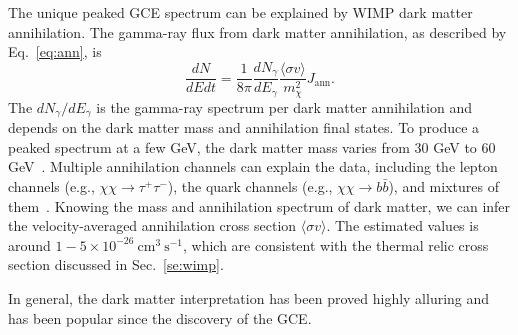 \documentclass[doublespace,nopageskip]{VTthesis}
\newcommand{\sigmav}{\langle\sigma v\rangle}
\begin{document}
The unique peaked GCE spectrum can be explained by WIMP dark matter annihilation. The gamma-ray flux from dark matter annihilation, as described by Eq.~\ref{eq:ann}, is
\begin{equation}
    \frac{dN}{dEdt} = \frac{1}{8\pi}\frac{dN_\gamma}{dE_\gamma}\frac{\sigmav}{m_\chi^2}J_\mathrm{ann}.
\end{equation}
The $dN_\gamma/dE_\gamma$ is the gamma-ray spectrum per dark matter annihilation and depends on the dark matter mass and annihilation final states. To produce a peaked spectrum at a few GeV, the dark matter mass varies from 30 GeV to 60 GeV~\cite{2011PhRvD..84l3005H, 2012PhRvD..86h3511A,2013PhRvD..88h3521G,2016PDU....12....1D,2015JCAP...03..038C}. Multiple annihilation channels can explain the data, including the lepton channels (e.g., $\chi\chi\to\tau^+\tau^-$), the quark channels (e.g., $\chi\chi\to b\bar{b}$), and mixtures of them~\cite{2011PhRvD..84l3005H, 2012PhRvD..86h3511A,2013PhRvD..88h3521G,2016PDU....12....1D,2015JCAP...03..038C}. Knowing the mass and annihilation spectrum of dark matter, we can infer the velocity-averaged annihilation cross section $\sigmav$. The estimated values is around $1 - 5 \times 10^{-26}\ \mathrm{cm}^3\  \mathrm{s}^{-1}$, which are consistent with the thermal relic cross section discussed in Sec.~\ref{se:wimp}.

In general, the dark matter interpretation has been proved highly alluring and has been popular since the discovery of the GCE.




\end{document}
